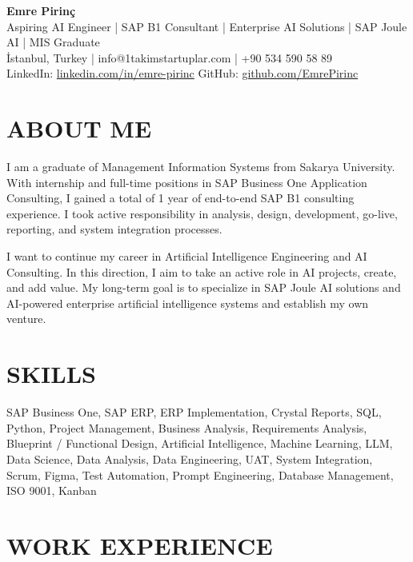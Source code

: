 \documentclass[a4paper,8pt]{article}
\begin{document}
\begin{center}
{\Large\bfseries Emre Pirinç}\\[2pt]
{\small Aspiring AI Engineer | SAP B1 Consultant | Enterprise AI Solutions | SAP Joule AI | MIS Graduate}\\[2pt]
{\small İstanbul, Turkey | info@1takimstartuplar.com | +90 534 590 58 89}\\[1pt]
{\small LinkedIn: \href{https://linkedin.com/in/emre-pirinc}{linkedin.com/in/emre-pirinc} \textbar{} GitHub: \href{https://github.com/EmrePirinc}{github.com/EmrePirinc}}
\end{center}

\vspace{-2pt}

\section{ABOUT ME}
{\small I am a graduate of Management Information Systems from Sakarya University. With internship and full-time positions in SAP Business One Application Consulting, I gained a total of 1 year of end-to-end SAP B1 consulting experience. I took active responsibility in analysis, design, development, go-live, reporting, and system integration processes.

I want to continue my career in Artificial Intelligence Engineering and AI Consulting. In this direction, I aim to take an active role in AI projects, create, and add value. My long-term goal is to specialize in SAP Joule AI solutions and AI-powered enterprise artificial intelligence systems and establish my own venture.}

\section{SKILLS}
{\small SAP Business One, SAP ERP, ERP Implementation, Crystal Reports, SQL, Python, Project Management, Business Analysis, Requirements Analysis, Blueprint / Functional Design, Artificial Intelligence, Machine Learning, LLM, Data Science, Data Analysis, Data Engineering, UAT, System Integration, Scrum, Figma, Test Automation, Prompt Engineering, Database Management, ISO 9001, Kanban}

\section{WORK EXPERIENCE}
\end{document}
